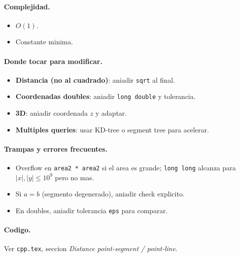 \paragraph{Complejidad.}
\begin{itemize}\setlength\itemsep{0pt}
	\item $O(1)$.
	\item Constante minima.
\end{itemize}

\paragraph{Donde tocar para modificar.}
\begin{itemize}\setlength\itemsep{0pt}
	\item \textbf{Distancia (no al cuadrado)}: aniadir \texttt{sqrt} al final.
	\item \textbf{Coordenadas doubles}: aniadir \texttt{long double} y tolerancia.
	\item \textbf{3D}: aniadir coordenada $z$ y adaptar.
	\item \textbf{Multiples queries}: usar KD-tree o segment tree para acelerar.
\end{itemize}

\paragraph{Trampas y errores frecuentes.}
\begin{itemize}\setlength\itemsep{0pt}
	\item Overflow en \texttt{area2 * area2} si el area es grande; \texttt{long long} alcanza para $|x|, |y| \le 10^9$ pero no mas.
	\item Si $a = b$ (segmento degenerado), aniadir check explicito.
	\item En doubles, aniadir tolerancia \texttt{eps} para comparar.
\end{itemize}

\paragraph{Codigo.}
Ver \texttt{cpp.tex}, seccion \textit{Distance point-segment / point-line}.

\vspace{0.5em}
